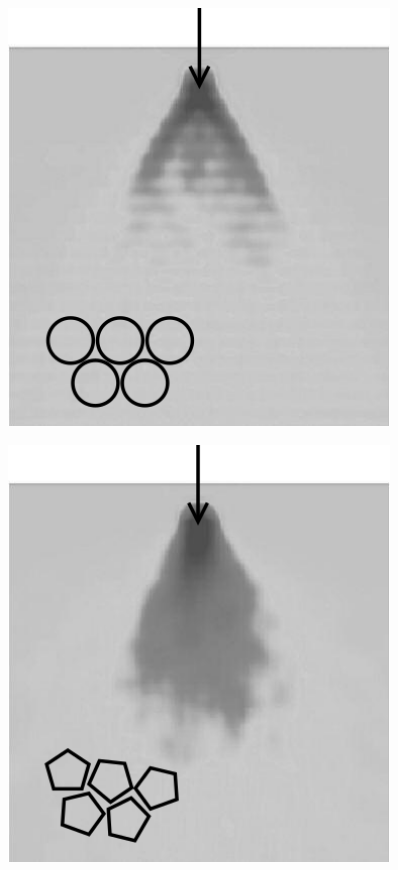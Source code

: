 \begin{figure}
    \centering
    \begin{minipage}{.45\linewidth}
        \centering
        \includegraphics[width=0.9\textwidth]{04-figuras/Funcao_Resposta1.png}
        \label{fig:stress_response:circle}
    \end{minipage}
    \begin{minipage}{.45\linewidth}
        \centering
        \includegraphics[width=0.9\textwidth]{04-figuras/Funcao_Resposta2.png}

\end{minipage}
\end{figure}
